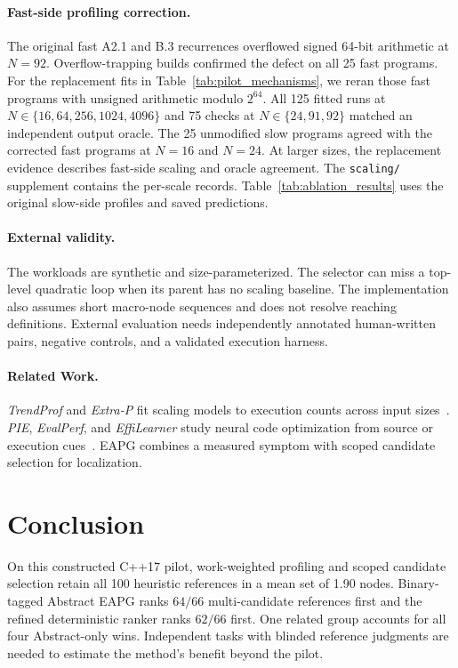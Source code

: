 \documentclass[10pt,conference]{IEEEtran}
\begin{document}
\paragraph{Fast-side profiling correction.}
The original fast A2.1 and B.3 recurrences overflowed signed 64-bit arithmetic at $N=92$. Overflow-trapping builds confirmed the defect on all 25 fast programs. For the replacement fits in Table~\ref{tab:pilot_mechanisms}, we reran those fast programs with unsigned arithmetic modulo $2^{64}$. All 125 fitted runs at $N\in\{16,64,256,1024,4096\}$ and 75 checks at $N\in\{24,91,92\}$ matched an independent output oracle. The 25 unmodified slow programs agreed with the corrected fast programs at $N=16$ and $N=24$. At larger sizes, the replacement evidence describes fast-side scaling and oracle agreement. The \texttt{scaling/} supplement contains the per-scale records. Table~\ref{tab:ablation_results} uses the original slow-side profiles and saved predictions.

\paragraph{External validity.}
The workloads are synthetic and size-parameterized. The selector can miss a top-level quadratic loop when its parent has no scaling baseline. The implementation also assumes short macro-node sequences and does not resolve reaching definitions. External evaluation needs independently annotated human-written pairs, negative controls, and a validated execution harness.

\paragraph{Related Work.}
\textit{TrendProf} and \textit{Extra-P} fit scaling models to execution counts across input sizes~\cite{goldsmith2007trendprof,copik2021extrap}. \textit{PIE}, \textit{EvalPerf}, and \textit{EffiLearner} study neural code optimization from source or execution cues~\cite{shypula2024pie,liu2024evalperf,huang2024effilearner}. EAPG combines a measured symptom with scoped candidate selection for localization.

\section{Conclusion}
\label{sec:conclusion}

On this constructed C++17 pilot, work-weighted profiling and scoped candidate selection retain all 100 heuristic references in a mean set of 1.90 nodes. Binary-tagged Abstract EAPG ranks $64/66$ multi-candidate references first and the refined deterministic ranker ranks $62/66$ first. One related group accounts for all four Abstract-only wins. Independent tasks with blinded reference judgments are needed to estimate the method's benefit beyond the pilot.



\end{document}
